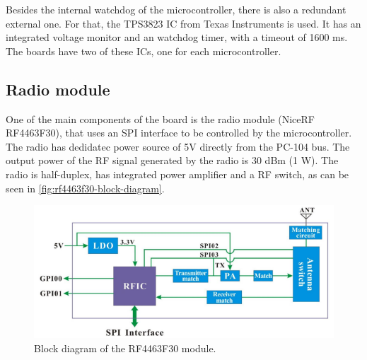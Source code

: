 Besides the internal watchdog of the microcontroller, there is also a redundant external one. For that, the TPS3823 IC from Texas Instruments is used. It has an integrated voltage monitor and an watchdog timer, with a timeout of 1600 ms. The boards have two of these ICs, one for each microcontroller.

\subsection{Radio module}

One of the main components of the board is the radio module (NiceRF RF4463F30), that uses an SPI interface to be controlled by the microcontroller. The radio has dedidatec power source of 5V directly from the PC-104 bus. The output power of the RF signal generated by the radio is 30 dBm (1 W). The radio is half-duplex, has integrated power amplifier and a RF switch, as can be seen in \autoref{fig:rf4463f30-block-diagram}.

\begin{figure}[!ht]
    \begin{center}
        \includegraphics[width=\textwidth]{figures/rf4463f30-block-diagram.png}
        \caption{Block diagram of the RF4463F30 module.}
        \label{fig:rf4463f30-block-diagram}
    \end{center}
\end{figure}
